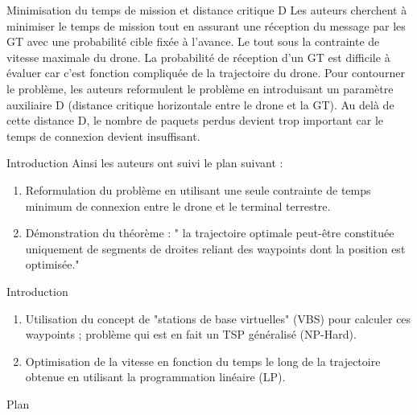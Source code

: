 \begin{frame}{Minimisation du temps de mission et distance critique D}
Les auteurs cherchent à minimiser le temps de mission tout en assurant une réception du message par les GT avec une probabilité cible fixée à l'avance. Le tout sous la contrainte de vitesse maximale du drone. La probabilité de réception d'un GT est difficile à évaluer car c'est fonction compliquée de la trajectoire du drone. Pour contourner le problème, les auteurs reformulent le problème en introduisant un paramètre auxiliaire D (distance critique horizontale entre le drone et la GT). Au delà de cette distance D, le nombre de paquets perdus devient trop important car le temps de connexion devient insuffisant. 


\end{frame}


\newcommand{\asuivre}{\setcounter{sauvegardeenumi}{\theenumi}}
\newcommand{\suite}{\setcounter{enumi}{\thesauvegardeenumi}}

\begin{frame}{Introduction}
	Ainsi les auteurs ont suivi le plan suivant : 
\begin{enumerate}
	
	\item Reformulation du problème en utilisant une seule contrainte
	de temps minimum de connexion entre le drone et le terminal terrestre.	
	\item Démonstration du théorème : " la trajectoire optimale
	peut-être constituée uniquement de segments de droites reliant des
	waypoints dont la position est optimisée."

	
\end{enumerate}
\asuivre
\end{frame}



\begin{frame}{Introduction}
 
\begin{enumerate}
	\suite
	\item Utilisation du concept de "stations de base virtuelles" (VBS) pour calculer ces waypoints ;  problème qui est en fait un TSP généralisé (NP-Hard).

	\item Optimisation de la vitesse en fonction du temps le long de la trajectoire obtenue
	en utilisant la programmation linéaire (LP).

\end{enumerate}

\end{frame}


\begin{frame}{Plan}
\tableofcontents
\end{frame}